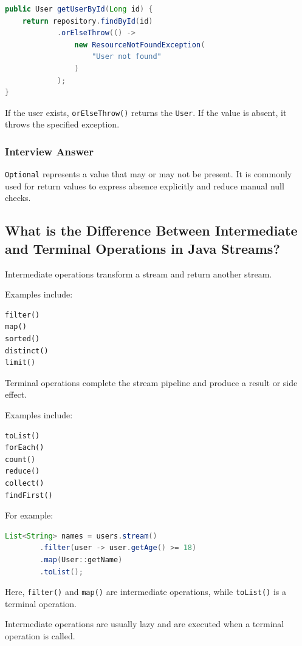 \documentclass[12pt,a4paper]{article}
\begin{document}
\begin{lstlisting}[language=Java]
public User getUserById(Long id) {
    return repository.findById(id)
            .orElseThrow(() ->
                new ResourceNotFoundException(
                    "User not found"
                )
            );
}
\end{lstlisting}

If the user exists, \texttt{orElseThrow()} returns the \texttt{User}.
If the value is absent, it throws the specified exception.

\subsubsection*{Interview Answer}

\texttt{Optional} represents a value that may or may not be present. It is
commonly used for return values to express absence explicitly and reduce
manual null checks.

\subsection{What is the Difference Between Intermediate and Terminal Operations in Java Streams?}

Intermediate operations transform a stream and return another stream.

Examples include:

\begin{verbatim}
filter()
map()
sorted()
distinct()
limit()
\end{verbatim}

Terminal operations complete the stream pipeline and produce a result or
side effect.

Examples include:

\begin{verbatim}
toList()
forEach()
count()
reduce()
collect()
findFirst()
\end{verbatim}

For example:

\begin{lstlisting}[language=Java]
List<String> names = users.stream()
        .filter(user -> user.getAge() >= 18)
        .map(User::getName)
        .toList();
\end{lstlisting}

Here, \texttt{filter()} and \texttt{map()} are intermediate operations,
while \texttt{toList()} is a terminal operation.

Intermediate operations are usually lazy and are executed when a terminal
operation is called.
\end{document}
